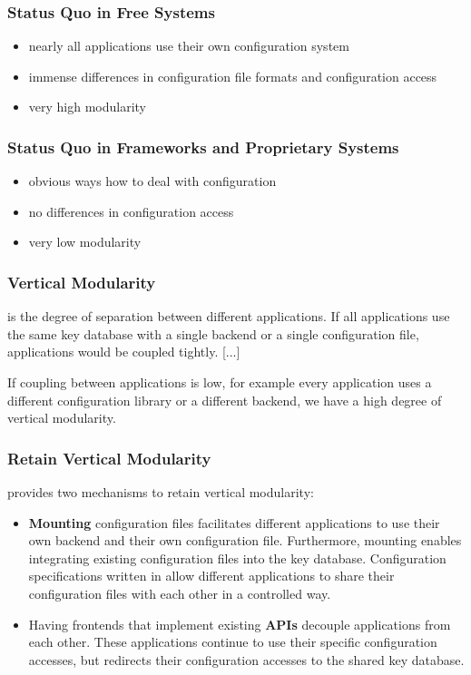 \begin{frame}
	\frametitle{Status Quo in Free Systems}

	\begin{itemize}[<+-| alert@+>]
	\item nearly all applications use their own configuration system
	\item immense differences in configuration file formats and configuration access
	\item very high modularity
	\end{itemize}
\end{frame}

\begin{frame}
	\frametitle{Status Quo in Frameworks and Proprietary Systems}

	\begin{itemize}[<+-| alert@+>]
	\item obvious ways how to deal with configuration
	\item no differences in configuration access
	\item very low modularity
	\end{itemize}
\end{frame}

\begin{frame}[fragile]
	\frametitle{Vertical Modularity \cite{raab2016improving}}

	 is the degree of separation between different applications.
	If all applications use the same key database with a single backend or a single configuration file, applications would be coupled tightly.
	[...]

	If coupling between applications is low, for example every application uses a different configuration library or a different backend, we have a high degree of vertical modularity.
\end{frame}

\begin{frame}
	\frametitle{Retain Vertical Modularity \cite{raab2016improving}}

	\elektra{} provides two mechanisms to retain vertical modularity:

	\begin{itemize}
	\item \textbf{Mounting} configuration files facilitates different applications to use their own backend and their own configuration file.
	Furthermore, mounting enables integrating existing configuration files into the key database.
	Configuration specifications written in  allow different applications to share their configuration files with each other in a controlled way.

	\item Having frontends that implement existing \textbf{APIs} decouple applications from each other.
	These applications continue to use their specific configuration accesses, but \elektra{} redirects their configuration accesses to the shared key database.
	\end{itemize}
\end{frame}

